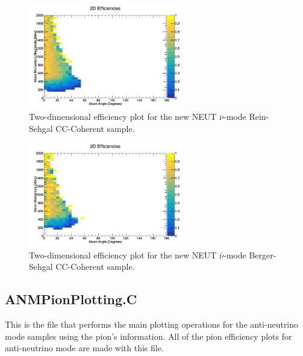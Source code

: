 \documentclass[11pt]{article}
\begin{document}
\begin{figure}[H]
\centering
\includegraphics[width=0.6\textwidth]{CCCohPlots/2DEffANMRS.png}
\caption{Two-dimensional efficiency plot for the new NEUT $\bar{\nu}$-mode Rein-Sehgal CC-Coherent sample.}
\end{figure}

\begin{figure}[H]
\centering
\includegraphics[width=0.6\textwidth]{CCCohPlots/2DEffANMBS.png}
\caption{Two-dimensional efficiency plot for the new NEUT $\bar{\nu}$-mode Berger-Sehgal CC-Coherent sample.}
\end{figure}

\subsection{ANMPionPlotting.C}
This is the file that performs the main plotting operations for the anti-neutrino mode samples using the pion's information. All of the pion efficiency plots for anti-neutrino mode are made with this file.
\end{document}
